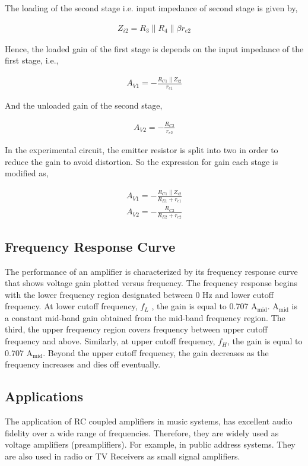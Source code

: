 The loading of the second stage i.e. input impedance of second stage is given by,

\begin{align}
    Z_{i2} = R_3 \parallel R_4 \parallel \beta r_{e2}
\end{align}

Hence, the loaded gain of the first stage is depends on the input impedance of the first stage, i.e.,

\begin{align}
    A_{V1} = -\frac{R_{C1} \parallel Z_{i2}}{r_{e1}}
\end{align}

And the unloaded gain of the second stage,

\begin{align}
    A_{V2} = -\frac{R_{C2}}{r_{e2}}
\end{align}

In the experimental circuit, the emitter resistor is split into two in order to
reduce the gain to avoid distortion. So the expression for gain each stage is modified as,

\begin{align}
    A_{V1} = -\frac{R_{C1} \parallel Z_{i2}}{R_{E1} + r_{e1}}\\
    A_{V2} = -\frac{R_{C2}}{R_{E2} + r_{e2}}
\end{align}

\subsection*{Frequency Response Curve}
The performance of an amplifier is characterized by its frequency response curve that
shows voltage gain plotted versus frequency. The frequency
response begins with the lower frequency region designated between 0 Hz and lower
cutoff frequency. At lower cutoff frequency, $f_L$ , the gain is equal to 0.707 A$_\text{mid}$. A$_\text{mid}$ is a
constant mid-band gain obtained from the mid-band frequency region. The third, the
upper frequency region covers frequency between upper cutoff frequency and above.
Similarly, at upper cutoff frequency, $f_H$, the gain is equal to 0.707 A$_\text{mid}$. Beyond the upper
cutoff frequency, the gain decreases as the frequency increases and dies off eventually.

\subsection*{Applications}
The application of RC coupled amplifiers in music systems, has excellent audio fidelity over a wide range of frequencies. Therefore, they are widely used as voltage amplifiers (preamplifiers). For example, in public address systems. They are also used in radio or TV Receivers as small signal amplifiers.